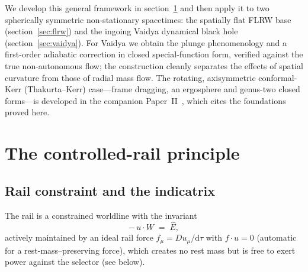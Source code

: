 \documentclass[12pt]{iopart}
\newcommand{\Ehat}{\hat E}
\newcommand{\dd}{\mathrm{d}}
\begin{document}
We develop this general framework in section~\ref{sec:principle} and then apply it to two
spherically symmetric non-stationary spacetimes: the spatially flat FLRW base
(section~\ref{sec:flrw}) and the ingoing Vaidya dynamical black hole
(section~\ref{sec:vaidya}). For Vaidya we obtain the plunge phenomenology and a
first-order adiabatic correction in closed special-function form, verified against the
true non-autonomous flow; the construction cleanly separates the effects of spatial
curvature from those of radial mass flow. The rotating, axisymmetric conformal-Kerr
(Thakurta--Kerr) case---frame dragging, an ergosphere and genus-two closed forms---is
developed in the companion Paper~II~\cite{PaperTwo}, which cites the foundations proved
here.

\section{The controlled-rail principle}
\label{sec:principle}

\subsection{Rail constraint and the indicatrix}
\label{sec:indicatrix}
The rail is a constrained worldline with the invariant
\begin{equation}
    -\,u\cdot W \;=\; \Ehat ,
    \label{eq:rail}
\end{equation}
actively maintained by an ideal rail force $f_\mu=Du_\mu/\dd\tau$ with
$f\cdot u=0$ (automatic for a rest-mass--preserving force), which creates no rest
mass but is free to exert power against the selector (see below).
\end{document}
